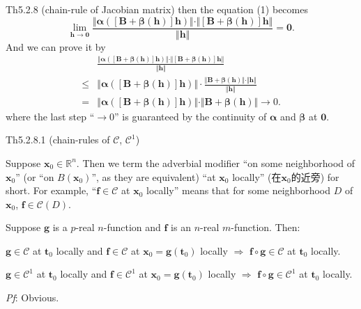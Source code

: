 \documentclass{article}
\begin{document}
\begin{Th}{Th5.2.8 (chain-rule of Jacobian matrix)}
    then the equation (1) becomes
    $$ \lim\limits_{\pmb{h}\to\pmb{0}}\frac{\Vert\pmb{\alpha}([\pmb{B} + \pmb{\beta}(\pmb{h})]\pmb{h})\Vert \cdot \Vert [\pmb{B} + \pmb{\beta}(\pmb{h})]\pmb{h}\Vert}{\Vert\pmb{h}\Vert} = \pmb{0}. $$
    And we can prove it by
    $$ 
    \begin{aligned}
        & \frac{\Vert\pmb{\alpha}([\pmb{B} + \pmb{\beta}(\pmb{h})]\pmb{h})\Vert \cdot \Vert [\pmb{B} + \pmb{\beta}(\pmb{h})]\pmb{h}\Vert}{\Vert\pmb{h}\Vert} \\
        \leq & \Vert\pmb{\alpha}([\pmb{B} + \pmb{\beta}(\pmb{h})]\pmb{h})\Vert \cdot \frac{\Vert \pmb{B} + \pmb{\beta}(\pmb{h})\Vert \cdot \Vert\pmb{h}\Vert}{\Vert\pmb{h}\Vert} \\
        = & \Vert\pmb{\alpha}([\pmb{B} + \pmb{\beta}(\pmb{h})]\pmb{h})\Vert \cdot \Vert \pmb{B} + \pmb{\beta}(\pmb{h})\Vert \rightarrow 0.
    \end{aligned}
    $$
    where the last step ``$\rightarrow 0$'' is guaranteed by the continuity of $\pmb{\alpha}$ and $\pmb{\beta}$ at $\pmb{0}$.
\end{Th}

\begin{Th}{Th5.2.8.1 (chain-rules of $\mathcal{C}$, $\mathcal{C}^1$)}
    \begin{compactenum}
        \item \textcolor{Df}{Suppose $\pmb{x}_0\in\mathbb{R}^n$. Then we term the adverbial modifier ``on some neighborhood of $\pmb{x}_0$'' (or ``on $B(\pmb{x}_0)$'', as they are equivalent) ``at $\pmb{x}_0$ locally'' (在$\pmb{x}_0$的近旁) for short.} For example, ``$\pmb{f}\in\mathcal{C}$ at $\pmb{x}_0$ locally'' means that for some neighborhood $D$ of $\pmb{x}_0$, $\pmb{f}\in\mathcal{C}(D)$.
        \item Suppose $\pmb{g}$ is a $p$-real $n$-function and $\pmb{f}$ is an $n$-real $m$-function. Then: \begin{compactenum}
            \item $\pmb{g}\in\mathcal{C}$ at $\pmb{t}_0$ locally and $\pmb{f}\in\mathcal{C}$ at $\pmb{x}_0 = \pmb{g}(\pmb{t}_0)$ locally $\Rightarrow$ $\pmb{f}\circ\pmb{g}\in\mathcal{C}$ at $\pmb{t}_0$ locally.
            \item $\pmb{g}\in\mathcal{C}^1$ at $\pmb{t}_0$ locally and $\pmb{f}\in\mathcal{C}^1$ at $\pmb{x}_0 = \pmb{g}(\pmb{t}_0)$ locally $\Rightarrow$ $\pmb{f}\circ\pmb{g}\in\mathcal{C}^1$ at $\pmb{t}_0$ locally.
        \end{compactenum}
    \end{compactenum}
    \tcblower
    \textit{Pf}: Obvious.
\end{Th}
\end{document}

